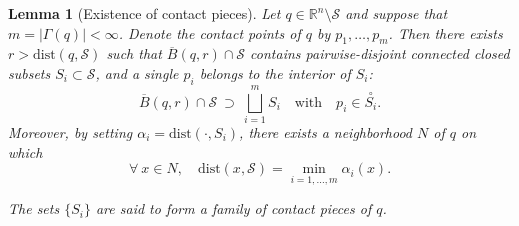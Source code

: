 \documentclass[11pt]{article}
\newcommand{\R}{\mathbb{R}}
\newcommand{\inter}{\cap}
\newcommand{\dist}{\mathrm{dist}}
\newcommand{\Surf}{\mathcal{S}}
\theoremstyle{plain}
\newtheorem{lem}{Lemma}
\theoremstyle{definition}
\theoremstyle{remark}
\begin{document}
	\begin{lem}[Existence of contact pieces] \label{lem:pieces}
		Let $q \in \R^n \setminus \Surf$ and suppose that $m = |\Gamma(q)| < \infty$. Denote the contact points of $q$ by $p_1,\ldots,p_m$. 
		Then there exists $r > \dist(q, \Surf)$ such that $\overline{B}(q,r) \inter \Surf$ contains pairwise-disjoint connected closed subsets $S_i \subset \Surf$,
		and a single $p_i$ belongs to the interior of $S_i$:
		\begin{equation} \label{eq:pieces}
			\overline{B}(q,r) \inter \Surf ~ \supset ~ \bigsqcup\limits_{i=1}^m S_i \quad \text{with} \quad p_i \in \overset{\circ}{S_i}.
		\end{equation}
		Moreover, by setting $\alpha_i = \dist(\cdot, S_i)$, there exists a neighborhood $N$ of $q$ on which 
		\begin{equation} \label{eq:alpha_i}
			\forall\ x \in N, \quad \dist(x, \Surf) = \min \limits_{i = 1,\ldots,m} \alpha_i(x).
		\end{equation}
		
		The sets $\{S_i\}$ are said to form a family of \emph{contact pieces} of $q$.
	\end{lem}
\end{document}
